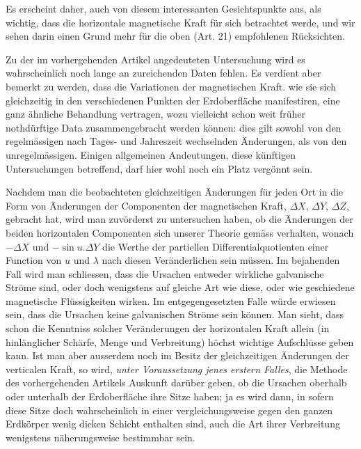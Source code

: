 Es erscheint daher, auch von diesem interessanten Gesichtspunkte aus, als wichtig, dass die horizontale magnetische Kraft für sich betrachtet werde, und wir sehen darin einen Grund mehr für die oben (Art. 21) empfohlenen Rücksichten.

\par\clearpage
{}
Zu der im vorhergehenden Artikel angedeuteten Untersuchung wird es wahrscheinlich noch lange an zureichenden Daten fehlen. Es verdient aber bemerkt zu werden, dass die Variationen der magnetischen Kraft. wie sie sich gleichzeitig in den verschiedenen Punkten der Erdoberfläche manifestiren, eine ganz ähnliche Behandlung vertragen, wozu vielleicht schon weit früher nothdürftige Data zusammengebracht werden können: dies gilt sowohl von den regelmässigen nach Tages- und Jahreszeit wechselnden Änderungen, als von den unregelmässigen. Einigen allgemeinen Andeutungen, diese künftigen Untersuchungen betreffend, darf hier wohl noch ein Platz vergönnt sein.

Nachdem man die beobachteten gleichzeitigen Änderungen für jeden Ort in die Form von Änderungen der Componenten der magnetischen Kraft, $\Delta X$, $\Delta Y$, $\Delta Z$, gebracht hat, wird man zuvörderst zu untersuchen haben, ob die Änderungen der beiden horizontalen Componenten sich unserer Theorie gemäss verhalten, wonach $-\Delta X$ und $-\sin u.\Delta Y$ die Werthe der partiellen Differentialquotienten einer Function von $u$ und $\lambda$ nach diesen Veränderlichen sein müssen. Im bejahenden Fall wird man schliessen, dass die Ursachen entweder wirkliche galvanische Ströme sind, oder doch wenigstens auf gleiche Art wie diese, oder wie geschiedene magnetische Flüssigkeiten wirken. Im entgegengesetzten Falle würde erwiesen sein, dass die Ursachen keine galvanischen Ströme sein können. Man sieht, dass schon die Kenntniss solcher Veränderungen der horizontalen Kraft allein (in hinlänglicher Schärfe, Menge und Verbreitung) höchst wichtige Aufschlüsse geben kann. Ist man aber ausserdem noch im Besitz der gleichzeitigen Änderungen der verticalen Kraft, so wird, \textit{unter Voraussetzung jenes erstern Falles}, die Methode des vorhergehenden Artikels Auskunft darüber geben, ob die Ursachen oberhalb oder unterhalb der Erdoberfläche ihre Sitze haben; ja es wird dann, in sofern diese Sitze doch wahrscheinlich in einer vergleichungsweise gegen den ganzen Erdkörper wenig dicken Schicht enthalten sind, auch die Art ihrer Verbreitung wenigstens näherungsweise bestimmbar sein.

